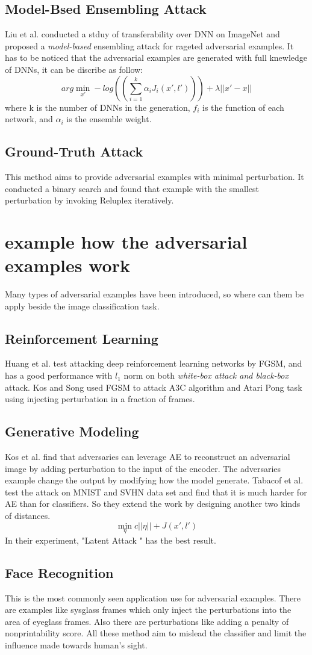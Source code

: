 \documentclass[twoside,twocolumn]{article}
\begin{document}
\subsection{Model-Bsed Ensembling Attack}
Liu et al. conducted a stduy of transferability over DNN on ImageNet and proposed a \emph{model-based} ensembling attack for rageted adversarial examples. It has to be noticed that the adversarial examples are generated with full knewledge of DNNs, it can be discribe as follow:
$$arg \min_{x'} - log((\sum_{i = 1}^{k}\alpha_i J_i(x', l')))+ \lambda||x' - x||$$
where k is the number of DNNs in the generation, $f_i$ is the function of each network, and $\alpha_i$ is the ensemble weight.
\subsection{Ground-Truth Attack}
This method aims to provide adversarial examples with minimal perturbation. It conducted a binary search and found that example with the smallest perturbation by invoking Reluplex iteratively.
\section{example how the adversarial examples work}
Many types of adversarial examples have been introduced, so where can them be apply beside the image classification task.
\subsection{Reinforcement Learning}
Huang et al. test attacking deep reinforcement learning networks by FGSM, and has a good performance with $l_1$ norm on both \emph{white-box attack and black-box} attack.
Kos and Song used FGSM to attack A3C algorithm and Atari Pong task using injecting perturbation in a fraction of frames.
\subsection{Generative Modeling}
Kos et al. find that adversaries can leverage AE to reconstruct an adversarial image by adding perturbation to the input of the encoder. The adversaries example change the output by modifying how the model generate. Tabacof et al. test the attack on MNIST and SVHN data set and find that it is much harder for AE than for classifiers. So they extend the work by designing another two kinds of distances.
$$\min_{\eta} c||\eta|| + J(x', l')$$
In their experiment, "Latent Attack " has the best result.
\subsection{Face Recognition}
This is the most commonly seen application use for adversarial examples. There are examples like sysglass frames which only inject the perturbations into the area of eyeglass frames. Also there are perturbations like adding a penalty of nonprintability score. All these method aim to mislead the classifier and limit the influence made towards human's sight.
\end{document}
